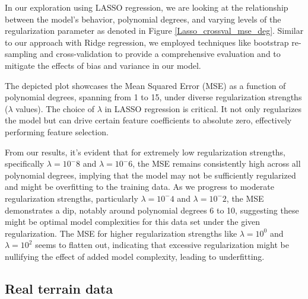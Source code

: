\noindent In our exploration using LASSO regression, we are looking at the relationship between the model's behavior, polynomial degrees, and varying levels of the regularization parameter as denoted in Figure \eqref{Lasso_crossval_mse_deg}. Similar to our approach with Ridge regression, we employed techniques like bootstrap re-sampling and cross-validation to provide a comprehensive evaluation and to mitigate the effects of bias and variance in our model.

\noindent The depicted plot showcases the Mean Squared Error (MSE) as a function of polynomial degrees, spanning from 1 to 15, under diverse regularization strengths ($\lambda$ values). The choice of $\lambda$ in LASSO regression is critical. It not only regularizes the model but can drive certain feature coefficients to absolute zero, effectively performing feature selection.

\noindent From our results, it's evident that for extremely low regularization strengths, specifically $\lambda =10^-8$ and $\lambda=10^-6$, the MSE remains consistently high across all polynomial degrees, implying that the model may not be sufficiently regularized and might be overfitting to the training data. As we progress to moderate regularization strengths, particularly $\lambda =10^-4$ and $\lambda=10^-2$, the MSE demonstrates a dip, notably around polynomial degrees 6 to 10, suggesting these might be optimal model complexities for this data set under the given regularization. The MSE for higher regularization strengths like $\lambda =10^0$ and $\lambda=10^2$ seems to flatten out, indicating that excessive regularization might be nullifying the effect of added model complexity, leading to underfitting.

\subsection{Real terrain data}
